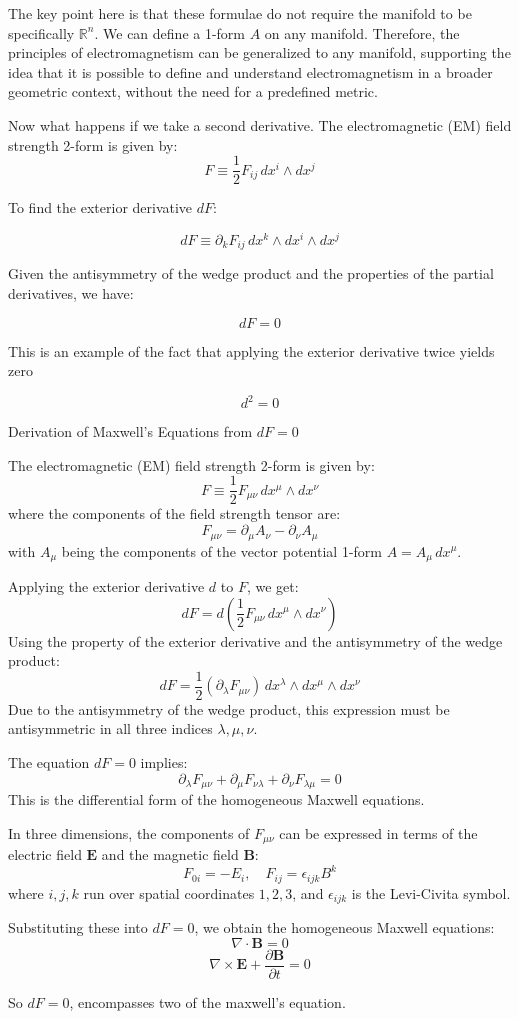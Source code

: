 \documentclass{article}
\begin{document}
The key point here is that these formulae do not require the manifold to be specifically \(\mathbb{R}^n\). We can define a 1-form \( A \) on any manifold. Therefore, the principles of electromagnetism can be generalized to any manifold, supporting the idea that it is possible to define and understand electromagnetism in a broader geometric context, without the need for a predefined metric.

Now what happens if we take a second derivative. 
The electromagnetic (EM) field strength 2-form is given by:
\[
F \equiv \frac{1}{2} F_{ij} \, dx^i \wedge dx^j
\]

To find the exterior derivative \( dF \):

\[
dF \equiv \partial_k F_{ij} \, dx^k \wedge dx^i \wedge dx^j
\]

Given the antisymmetry of the wedge product and the properties of the partial derivatives, we have:

\[
dF = 0
\]

This is an example of the fact that applying the exterior derivative twice yields zero

\[
d^2 = 0
\]

Derivation of Maxwell's Equations from \(dF = 0\)

The electromagnetic (EM) field strength 2-form is given by:
\[
F \equiv \frac{1}{2} F_{\mu\nu} \, dx^\mu \wedge dx^\nu
\]
where the components of the field strength tensor are:
\[
F_{\mu\nu} = \partial_\mu A_\nu - \partial_\nu A_\mu
\]
with \(A_\mu\) being the components of the vector potential 1-form \(A = A_\mu \, dx^\mu\).

Applying the exterior derivative \(d\) to \(F\), we get:
\[
dF = d \left(\frac{1}{2} F_{\mu\nu} \, dx^\mu \wedge dx^\nu\right)
\]
Using the property of the exterior derivative and the antisymmetry of the wedge product:
\[
dF = \frac{1}{2} (\partial_\lambda F_{\mu\nu}) \, dx^\lambda \wedge dx^\mu \wedge dx^\nu
\]
Due to the antisymmetry of the wedge product, this expression must be antisymmetric in all three indices \(\lambda, \mu, \nu\).

The equation \(dF = 0\) implies:
\[
\partial_\lambda F_{\mu\nu} + \partial_\mu F_{\nu\lambda} + \partial_\nu F_{\lambda\mu} = 0
\]
This is the differential form of the homogeneous Maxwell equations.

In three dimensions, the components of \(F_{\mu\nu}\) can be expressed in terms of the electric field \(\mathbf{E}\) and the magnetic field \(\mathbf{B}\):
\[
F_{0i} = -E_i, \quad F_{ij} = \epsilon_{ijk} B^k
\]
where \(i, j, k\) run over spatial coordinates \(1, 2, 3\), and \(\epsilon_{ijk}\) is the Levi-Civita symbol.

Substituting these into \(dF = 0\), we obtain the homogeneous Maxwell equations:
\[
\nabla \cdot \mathbf{B} = 0
\]
\[
\nabla \times \mathbf{E} + \frac{\partial \mathbf{B}}{\partial t} = 0
\]

So \( dF = 0 \), encompasses two of the maxwell's equation.
\end{document}
